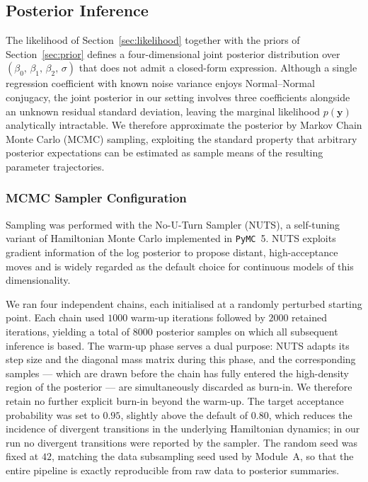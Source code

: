 \subsection{Posterior Inference}\label{sec:posterior}

The likelihood of Section~\ref{sec:likelihood} together with the priors of Section~\ref{sec:prior} defines a four-dimensional joint posterior distribution over $(\beta_0,\, \beta_1,\, \beta_2,\, \sigma)$ that does not admit a closed-form expression. Although a single regression coefficient with known noise variance enjoys Normal--Normal conjugacy, the joint posterior in our setting involves three coefficients alongside an unknown residual standard deviation, leaving the marginal likelihood $p(\mathbf{y})$ analytically intractable. We therefore approximate the posterior by Markov Chain Monte Carlo (MCMC) sampling, exploiting the standard property that arbitrary posterior expectations can be estimated as sample means of the resulting parameter trajectories.

\subsubsection{MCMC Sampler Configuration}

Sampling was performed with the No-U-Turn Sampler (NUTS), a self-tuning variant of Hamiltonian Monte Carlo implemented in \texttt{PyMC}~5. NUTS exploits gradient information of the log posterior to propose distant, high-acceptance moves and is widely regarded as the default choice for continuous models of this dimensionality.

We ran four independent chains, each initialised at a randomly perturbed starting point. Each chain used $1000$ warm-up iterations followed by $2000$ retained iterations, yielding a total of $8000$ posterior samples on which all subsequent inference is based. The warm-up phase serves a dual purpose: NUTS adapts its step size and the diagonal mass matrix during this phase, and the corresponding samples — which are drawn before the chain has fully entered the high-density region of the posterior — are simultaneously discarded as burn-in. We therefore retain no further explicit burn-in beyond the warm-up. The target acceptance probability was set to $0.95$, slightly above the default of $0.80$, which reduces the incidence of divergent transitions in the underlying Hamiltonian dynamics; in our run no divergent transitions were reported by the sampler. The random seed was fixed at $42$, matching the data subsampling seed used by Module~A, so that the entire pipeline is exactly reproducible from raw data to posterior summaries.

